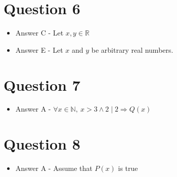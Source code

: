 \documentclass[12pt]{article}
\begin{document}
\section*{Question 6}
\begin{itemize}
    \item Answer C - Let $x,y \in \mathbb{R}$
    \item Answer E - Let $x$ and $y$ be arbitrary real numbers.
\end{itemize}

\section*{Question 7}
\begin{itemize}
    \item Answer A - $\forall x \in \mathbb{N},\:x > 3 \land 2 \mid 2 \Rightarrow Q(x)$
\end{itemize}

\section*{Question 8}
\begin{itemize}
    \item Answer A - Assume that $P(x)$ is true
\end{itemize}
\end{document}
